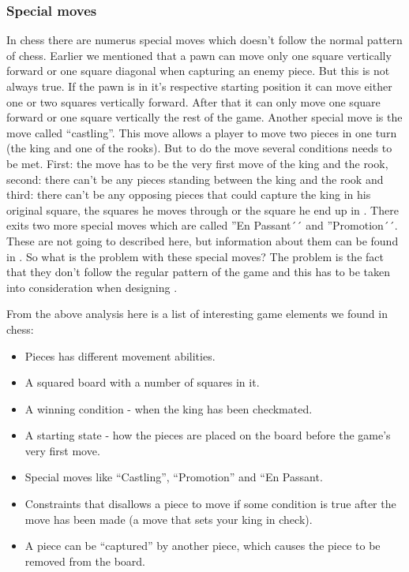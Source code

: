 \subsubsection{Special moves} 
In chess there are numerus special moves which doesn't follow the normal pattern of chess. Earlier we mentioned that a pawn can move only one square vertically forward or one square diagonal when capturing an enemy piece. But this is not always true. If the pawn is in it's respective starting position it can move either one or two squares vertically forward. After that it can only move one square forward or one square vertically the rest of the game. Another special move is the move called ``castling''. This move allows a player to move two pieces in one turn (the king and one of the rooks). But to do the move several conditions needs to be met. First: the move has to be the very first move of the king and the rook, second: there can't be any pieces standing between the king and the rook and third: there can't be any opposing pieces that could capture the king in his original square, the squares he moves through or the square he end up in \cite{chessrules}. There exits two more special moves which are called ''En Passant´´ and ''Promotion´´. These are not going to described here, but information about them can be found in \cite{chessrules}. So what is the problem with these special moves? The problem is the fact that they don't follow the regular pattern of the game and this has to be taken into consideration when designing \productname{}.


From the above analysis here is a list of interesting game elements we found in chess:
\begin{itemize}[noitemsep]
\item Pieces has different movement abilities.
\item A squared board with a number of squares in it.
\item A winning condition - when the king has been checkmated.
\item A starting state - how the pieces are placed on the board before the game's very first move.
\item Special moves like ``Castling'', ``Promotion'' and ``En Passant.
\item Constraints that disallows a piece to move if some condition is true after the move has been made (a move that sets your king in check).
\item A piece can be ``captured'' by another piece, which causes the piece to be removed from the board.
\end{itemize}
